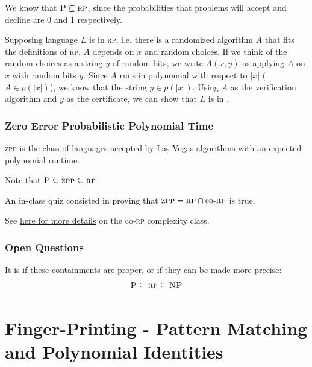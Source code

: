                     We know that $\textsc{P} \subseteq \textsc{rp}$, since the probabilities that \p problems will accept and decline are 0 and 1 respectively.

                    Supposing language $L$ is in \textsc{rp}, i.e. there is a randomized algorithm $A$ that fits the definitions of \textsc{rp}.
                    $A$ depends on $x$ and random choices.
                    If we think of the random choices as a string $y$ of random bits, we write $A(x, y)$ as applying $A$ on $x$ with random bits $y$.
                    Since $A$ runs in polynomial with respect to $|x|$ ($A \in p(|x|)$), we know that the string $y \in p(|x|)$.
                    Using $A$ as the verification algorithm and $y$ as the certificate, we can show that $L$ is in \np.
                \subsection{Zero Error Probabilistic Polynomial Time} %
                \label{sub:zero_error_probabilistic_polynomial_time}
                    \textsc{zpp} is the class of languages accepted by Las Vegas algorithms with an expected polynomial runtime.

                    Note that $\textsc{P} \subseteq \textsc{zpp} \subseteq \textsc{rp}$.

                    An in-class quiz consisted in proving that $\textsc{zpp} = \textsc{rp} \cap \text{co-}\textsc{rp}$ is true.

                    See \href{https://en.wikipedia.org/wiki/RP_(complexity)}{here for more details} on the co-\textsc{rp} complexity class.
                \subsection{Open Questions} %
                \label{sub:open_questions}
                    It is \open if these containments are proper, or if they can be made more precise:
                    \begin{align*}
                        \textsc{P} \subseteq \textsc{rp} \subseteq \textsc{NP}
                    \end{align*}
        \chapter{Finger-Printing - Pattern Matching and Polynomial Identities} %
        \label{cha:finger_printing_for_pattern_matching_and_polynomial_identities}
